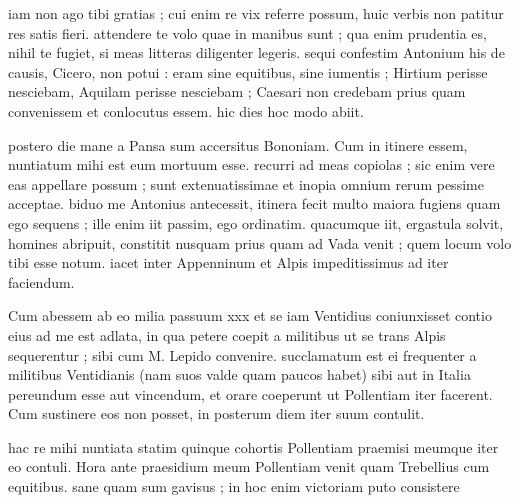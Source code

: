


 iam non ago tibi gratias ; cui enim re vix referre possum, huic verbis non patitur res satis fieri. attendere te volo quae in manibus sunt ; qua enim prudentia es, nihil te fugiet, si meas litteras diligenter legeris. sequi confestim Antonium his de causis, Cicero, non potui : eram sine equitibus, sine iumentis ; Hirtium perisse nesciebam, Aquilam perisse nesciebam ; Caesari non credebam prius quam convenissem et conlocutus essem. hic dies hoc modo abiit.

 postero die mane a Pansa sum accersitus Bononiam. Cum in itinere essem, nuntiatum mihi est eum mortuum esse. recurri ad meas copiolas ; sic enim vere eas appellare possum ; sunt extenuatissimae et inopia omnium rerum pessime acceptae. biduo me Antonius antecessit, itinera fecit multo maiora fugiens quam ego sequens ; ille enim iit passim, ego ordinatim. quacumque iit, ergastula solvit, homines abripuit, constitit nusquam prius quam ad Vada venit ; quem locum volo tibi esse notum. iacet inter Appenninum et Alpis impeditissimus ad iter faciendum.

 Cum abessem ab eo milia passuum xxx et se iam Ventidius coniunxisset contio eius ad me est adlata, in qua petere coepit a militibus ut se trans Alpis sequerentur ; sibi cum M. Lepido convenire. succlamatum est ei frequenter a militibus Ventidianis (nam suos valde quam paucos habet) sibi aut in Italia pereundum esse aut vincendum, et orare coeperunt ut Pollentiam iter facerent. Cum sustinere eos non posset, in posterum diem iter suum contulit.

 hac re mihi nuntiata statim quinque cohortis Pollentiam praemisi meumque iter eo contuli. Hora ante praesidium meum Pollentiam venit quam Trebellius cum equitibus. sane quam sum gavisus ; in hoc enim victoriam puto consistere
